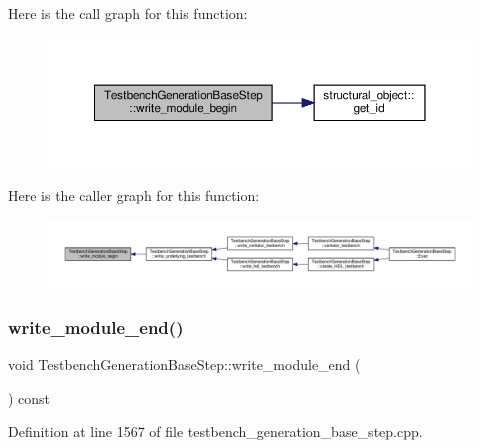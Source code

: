 Here is the call graph for this function\+:
\nopagebreak
\begin{figure}[H]
\begin{center}
\leavevmode
\includegraphics[width=350pt]{dc/d02/classTestbenchGenerationBaseStep_abdf8e7f71d552b9d0fc929247fb1e44a_cgraph}
\end{center}
\end{figure}
Here is the caller graph for this function\+:
\nopagebreak
\begin{figure}[H]
\begin{center}
\leavevmode
\includegraphics[width=350pt]{dc/d02/classTestbenchGenerationBaseStep_abdf8e7f71d552b9d0fc929247fb1e44a_icgraph}
\end{center}
\end{figure}
\mbox{\label{classTestbenchGenerationBaseStep_ae306dc453042f5b49d7a0a7efdbd094a}} 
\subsubsection{\texorpdfstring{write\+\_\+module\+\_\+end()}{write\_module\_end()}}
{\footnotesize\ttfamily void Testbench\+Generation\+Base\+Step\+::write\+\_\+module\+\_\+end (\begin{DoxyParamCaption}{ }\end{DoxyParamCaption}) const\hspace{0.3cm}{\ttfamily [protected]}}



Definition at line 1567 of file testbench\+\_\+generation\+\_\+base\+\_\+step.\+cpp.



